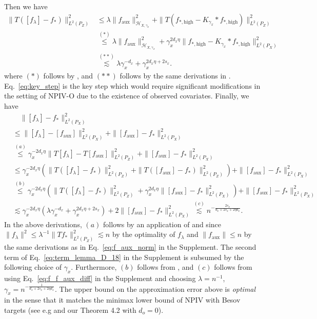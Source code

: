\documentclass[11pt]{article}
\newcommand{\calH}{\mathcal{H}}
\newcommand{\0}{\mathbf{0}}
\newcommand{\steve}[1]{#1}
\begin{document}
Then we have
\begin{align}
    \|T([f_{\lambda}] - f_{\ast})\|^2_{L^2(P_{Z})} &\leq \lambda \|f_{\mathrm{aux}}\|^2_{\calH_{X,\gamma_x}} + \|T(f_{\ast,\mathrm{high}} - K_{\gamma_x}\ast f_{\ast, \mathrm{high}})\|^2
    _{L^2(P
    _{Z})} \nonumber \\
    &\stackrel{(\ast)}{\leq} \lambda \|f_{\mathrm{aux}}\|^2_{\calH_{X,\gamma_x}} + \gamma_x^{2d_x\eta}\|f_{\ast,\mathrm{high}} - K_{\gamma_x}\ast f_{\ast, \mathrm{high}}\|^2
    _{L^2(P_{X})} \label{eq:key_step} \\
    &\stackrel{(\ast\ast)}\lesssim \lambda \gamma_x^{-d_x} + \gamma_x^{2d_x\eta + 2s_x} \nonumber .
\end{align}
where $(\ast)$ follows by , and $(\ast\ast)$ follows by the same derivations in \citet[Theorem 2.2, Theorem 2.3]{eberts2013optimal}. 
Eq.~\eqref{eq:key_step} is the key step which would require significant modifications in the setting of NPIV-O due to the existence of observed covariates. Finally, we have
\begin{align*}
    &\quad \|[f_{\lambda}] - f_{\ast}\|^2_{L^2(P_{X})}\nonumber\\
    &\leq \|[f_{\lambda}] - [f_{\mathrm{aux}}]\|^2_{L^2(P_{X})} + \|[f_{\mathrm{aux}}] - f_{\ast}\|^2_{L^2(P_{X})}\nonumber\\
    &\stackrel{(a)}{\leq} \gamma_{x}^{-2d_x\eta} \|T[f_{\lambda}] - T [f_{\mathrm{aux}}]\|^2_{L^2(P_{Z})} + \|[f_{\mathrm{aux}}] - f_{\ast}\|^2_{L^2(P_{X})}\nonumber\\
    &\leq \gamma_{x}^{-2d_x\eta}\left(\|T([f_{\lambda}] - f_{\ast})\|^2_{L^2(P_{Z})} + \|T([f_{\mathrm{aux}}] - f_{\ast})\|^2_{L^2(P_{Z})}\right) + \|[f_{\mathrm{aux}}] - f_{\ast}\|^2_{L^2(P_{X})}\nonumber\\
    &\stackrel{(b)}{\leq} \gamma_{x}^{-2d_x\eta}\left(\|T([f_{\lambda}] - f_{\ast})\|^2_{L^2(P_{Z})} + \gamma_x^{2d_x\eta}\|[f_{\mathrm{aux}}] - f_{\ast}\|^2_{L^2(P_{X})}\right) + \|[f_{\mathrm{aux}}] - f_{\ast}\|^2_{L^2(P_{X})}\nonumber\\
    &\lesssim \gamma_x^{-2d_x\eta} \left(\lambda \gamma_x^{-d_x} + \gamma_x^{2d_x\eta + 2s_x} \right) + \steve{2} \|[f_{\mathrm{aux}}] - f_{\ast}\|^2_{L^2(P_{X})} \nonumber \stackrel{(c)}{\lesssim} n^{-\frac{2s_x}{d_x + 2s_x + 2\eta d_x}} .
\end{align*}
In the above derivations, $(a)$ follows by an application of  and  since $\|f_\lambda\|^2 \leq \lambda^{-1}\|Tf_\ast\|_{L^2(P_Z)}^2 \lesssim n$ by the optimality of $f_\lambda$ and $\|f_{\text{aux}}\|\leq n$ by the same derivations as in Eq.~\eqref{eq:f_aux_norm} in the Supplement. The second term of Eq.~\eqref{eq:term_lemma_D_18} in the Supplement is subsumed by the following choice of $\gamma_x$. 
Furthermore, $(b)$ follows from , and $(c)$ follows from using Eq.~\eqref{eq:f_f_aux_diff} in the Supplement and choosing $
\lambda = n^{-1}$, $\gamma_x = n^{-\frac{1}{d_x + 2s_x + 2\eta d_x}}$.
The upper bound on the approximation error above is \emph{optimal} in the sense that \steve{it matches the minimax lower bound of NPIV with Besov targets (see e.g \citep{Chen_2018} and our Theorem 4.2 with $d_o=0$)}. 
\end{document}
